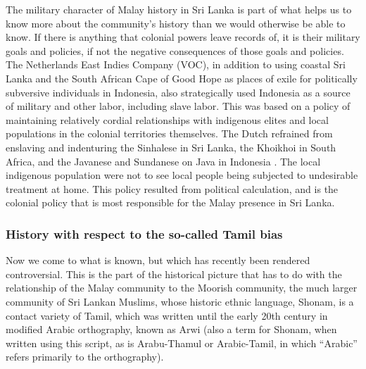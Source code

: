 The military character of Malay history in Sri Lanka is part of what helps us to know more about the community's history than we would otherwise be able to know. If there is anything that colonial powers leave records of, it is their military goals and policies, if not the negative consequences of those goals and policies. The Netherlands East Indies Company (VOC), in addition to using coastal Sri Lanka and the South African Cape of Good Hope as places of exile for politically subversive individuals in Indonesia, also strategically used Indonesia as a source of military and other labor, including slave labor. This was based on a policy of maintaining relatively cordial relationships with indigenous elites and local populations in the colonial territories themselves. The Dutch refrained from enslaving and indenturing the Sinhalese in Sri Lanka, the Khoikhoi in South Africa, and the Javanese and Sundanese on Java in Indonesia \citep{Ward2009}. The local indigenous population were not to see local people being subjected to undesirable treatment at home. This policy resulted from political calculation, and is the colonial policy that is most responsible for the Malay presence in Sri Lanka.

\subsubsection{History with respect to the so-called Tamil bias}%

Now we come to what is known, but which has recently been rendered controversial. This is the part of the historical picture that has to do with the relationship of the Malay community to the Moorish community, the much larger community of Sri Lankan Muslims, whose historic ethnic language, Shonam, is a contact variety of Tamil, which was written until the early 20th century in modified Arabic orthography, known as Arwi (also a term for Shonam, when written using this script, as is Arabu-Thamul or Arabic-Tamil, in which ``Arabic'' refers primarily to the orthography).

